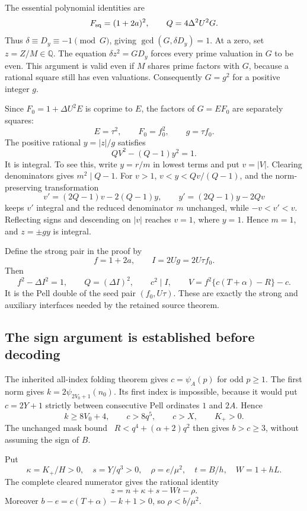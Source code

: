The essential polynomial identities are
\begin{equation}
 F_{\rm sq}=(1+2a)^2,\qquad
 Q=4\Delta^2U^2G.
 \label{eq:doubling-gcd}
\end{equation}
Thus $\delta\equiv D_y\equiv-1\pmod G$, giving
$\gcd(G,\delta D_y)=1$.  At a zero, set $z=Z/M\in\mathbb Q$.
The equation $\delta z^2=GD_y$ forces every prime valuation in $G$
to be even.  This argument is valid even if $M$ shares prime factors
with $G$, because a rational square still has even valuations.
Consequently $G=g^2$ for a positive integer $g$.

Since $F_0=1+\Delta U^2E$ is coprime to $E$, the factors of
$G=EF_0$ are separately squares:
\[
 E=\tau^2,\qquad F_0=f_0^2,\qquad g=\tau f_0.
\]
The positive rational $y=|z|/g$ satisfies
\begin{equation}
 QV^2-(Q-1)y^2=1.
 \label{eq:doubling-adjacent}
\end{equation}
It is integral.  To see this, write $y=r/m$ in lowest terms and put
$v=|V|$.  Clearing denominators gives $m^2\mid Q-1$.  For $v>1$,
$v<y<Qv/(Q-1)$, and the norm-preserving transformation
\[
 v'=(2Q-1)v-2(Q-1)y,\qquad
 y'=(2Q-1)y-2Qv
\]
keeps $v'$ integral and the reduced denominator $m$ unchanged, while
$-v<v'<v$.  Reflecting signs and descending on $|v|$ reaches $v=1$,
where $y=1$.  Hence $m=1$, and $z=\pm gy$ is integral.

Define the strong pair in the proof by
\[
 f=1+2a,\qquad I=2Ug=2U\tau f_0.
\]
Then
\[
 f^2-\Delta I^2=1,\qquad Q=(\Delta I)^2,\qquad c^2\mid I,
 \qquad V=f^2\{c(T+\alpha)-R\}-c.
\]
It is the Pell double of the seed pair $(f_0,U\tau)$.  These are
exactly the strong and auxiliary interfaces needed by the retained
source theorem.

\subsection{The sign argument is established before decoding}

The inherited all-index folding theorem gives $c=\psi_A(p)$ for odd
$p\ge1$.  The first norm gives
$k=2\psi_{2V_0+1}(n_0)$.  Its first index is impossible, because it
would put $c=2Y+1$ strictly between consecutive Pell ordinates $1$
and $2A$.  Hence
\[
 k\ge8V_0+4,\qquad c>8q^5,\qquad c>X,\qquad K_+>0.
\]
The unchanged mask bound~\cite{saturated} $R<q^4+(\alpha+2)q^2$ then gives $b>c\ge3$,
without assuming the sign of $B$.

Put
\[
 \kappa=K_+/H>0,\quad s=Y/q^3>0,\quad
 \rho=e/\mu^2,\quad t=B/h,\quad W=1+hL.
\]
The complete cleared numerator gives the rational identity
\begin{equation}
 z=n+\kappa+s-Wt-\rho.
 \label{eq:doubling-carrier}
\end{equation}
Moreover $b-e=c(T+\alpha)-k+1>0$, so $\rho<b/\mu^2$.

